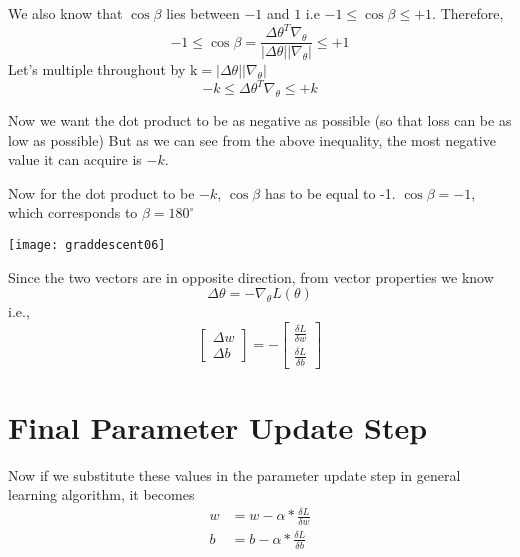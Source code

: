 We also know that $\cos\beta$ lies between $-1$ and $1$ i.e $-1 \leq\cos\beta \leq +1 $.
Therefore,
\begin{equation}
-1 \leq \cos \beta=\frac{\Delta \theta^{T} \nabla_{\theta}}{|\Delta \theta|\left|\nabla_{\theta}\right|} \leq+1
\end{equation}
Let's multiple throughout by $\mathrm{k}=|\Delta \theta|\left|\nabla_{\theta}\right|$
\begin{equation}
-k \leq \Delta \theta^{T} \nabla_{\theta} \leq+k
\end{equation}



Now we want the dot product to be as negative as possible (so that loss can be as low as possible)
But as we can see from the above inequality, the most negative value it can acquire is $-k$.

Now for the dot product to be $-k$, $\cos\beta$ has to be equal to -1.
$\cos\beta=-1$, which  corresponds to $\beta = 180^\circ$
\begin{marginfigure}
\texttt{[image: graddescent06]}
\end{marginfigure}


Since the two vectors are in opposite direction, from vector properties we know
\begin{equation}
\Delta \theta=-\nabla_{\theta} L(\theta)
\end{equation}
i.e.,
\begin{equation}
\left[\begin{array}{l}{\Delta w} \\ {\Delta b}\end{array}\right]=-\left[\begin{array}{c}{\frac{\delta L}{\delta w}} \\ {\frac{\delta L}{\delta b}}\end{array}\right]
\end{equation}




\section{Final Parameter Update Step}

Now if we substitute these values in the parameter update step in general learning algorithm, it becomes
\begin{equation}
\begin{aligned} w &=w-\alpha * \frac{\delta L}{\delta w} \\ b &=b-\alpha * \frac{\delta L}{\delta b} \end{aligned}
\end{equation}


